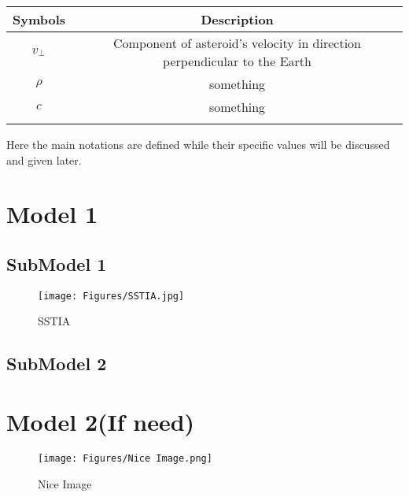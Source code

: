 \documentclass{Setup}
\begin{document}
\begin{table}[h!] %
\begin{tabularx}{\textwidth}{cc}
\toprule
\textbf{Symbols} & \textbf{Description}\\
\toprule
  $v_{\perp}$ & Component of asteroid's velocity in direction perpendicular to the Earth \\
  $\rho$ & something \\
  $c$ & something \\
\bottomrule
\label{Notation Table}
\end{tabularx}
\end{table}

Here the main notations are defined while their specific values will be discussed and given later.


\section{Model 1}
\subsection{SubModel 1}
    \begin{figure}[h!]
        \centering
        \texttt{[image: Figures/SSTIA.jpg]}
        \caption{SSTIA} \label{SSTIA}
    \end{figure}
    
    \lipsum[1-4] %
    
\subsection{SubModel 2}
\lipsum[1-4] %

\section{Model 2(If need)}
\lipsum[1-7] %

\newpage 
\begin{figure}[h!]
    \centering
    \texttt{[image: Figures/Nice Image.png]}
    \caption{Nice Image} \label{Nice Image}
\end{figure}
\end{document}
